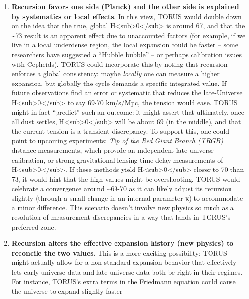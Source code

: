 \begin{enumerate}
\def\labelenumi{\arabic{enumi}.}
\item
  \textbf{Recursion favors one side (Planck) and the other side is
  explained by systematics or local effects.} In this view, TORUS would
  double down on the idea that the true, global
  H\textless{}sub\textgreater{}0\textless{}/sub\textgreater{} is around
  67, and that the \textasciitilde{}73 result is an apparent effect due
  to unaccounted factors (for example, if we live in a local underdense
  region, the local expansion could be faster -- some researchers have
  suggested a ``Hubble bubble'' -- or perhaps calibration issues with
  Cepheids). TORUS could incorporate this by noting that recursion
  enforces a global consistency: maybe \emph{locally} one can measure a
  higher expansion, but globally the cycle demands a specific integrated
  value. If future observations find an error or systematic that reduces
  the late-Universe
  H\textless{}sub\textgreater{}0\textless{}/sub\textgreater{} to say
  69-70 km/s/Mpc, the tension would ease. TORUS might in fact
  ``predict'' such an outcome: it might assert that ultimately, once all
  dust settles,
  H\textless{}sub\textgreater{}0\textless{}/sub\textgreater{} will be
  about 69 (in the middle)​, and that the current tension is a transient
  discrepancy. To support this, one could point to upcoming experiments:
  \emph{Tip of the Red Giant Branch (TRGB)} distance measurements, which
  provide an independent late-universe calibration, or strong
  gravitational lensing time-delay measurements of
  H\textless{}sub\textgreater{}0\textless{}/sub\textgreater{}. If these
  methods yield
  H\textless{}sub\textgreater{}0\textless{}/sub\textgreater{} closer to
  70 than 73, it would hint that the high values might be overshooting.
  TORUS would celebrate a convergence around \textasciitilde{}69-70 as
  it can likely adjust its recursion slightly (through a small change in
  an internal parameter κ) to accommodate a minor difference​. This
  scenario doesn't involve new physics so much as a resolution of
  measurement discrepancies in a way that lands in TORUS's preferred
  zone.
\item
  \textbf{Recursion alters the effective expansion history (new physics)
  to reconcile the two values.} This is a more exciting possibility:
  TORUS might actually allow for a non-standard expansion behavior that
  effectively lets early-universe data and late-universe data both be
  right in their regimes. For instance, TORUS's extra terms in the
  Friedmann equation could cause the universe to expand slightly faster

\end{enumerate}
